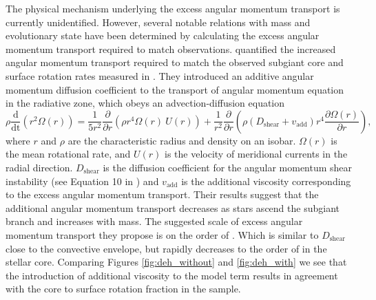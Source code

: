 The physical mechanism underlying the excess angular momentum transport is currently unidentified.
However, several notable relations with mass and evolutionary state have been determined by calculating the excess angular momentum transport required to match observations. 
\citet{spada_angular_2016} quantified the increased angular momentum transport required to match the observed subgiant core and surface rotation rates measured in \citet{deheuvels_seismic_2014}.
They introduced an additive angular momentum diffusion coefficient to the transport of angular momentum equation in the radiative zone, which obeys an advection-diffusion equation 
\begin{equation}
    \rho \frac{\text{d}}{\text{dt}}\left(r^2 \Omega \left( r \right)\right) = \frac{1}{5r^2}\frac{\partial}{\partial r}\left(\rho r^4 \Omega \left( r \right)
 \ U\left(r\right)\right) + \frac{1}{r^2}\frac{\partial}{\partial r} \left(\rho \left( D_{\text{shear}} + v_{\text{add}}\right) r^4 \frac{\partial \Omega\left( r \right)}{\partial r}\right),
\end{equation}
where $r$ and $\rho$ are the characteristic radius and density on an isobar. $\Omega(r)$ is the mean rotational rate, and $U(r)$ is the velocity of meridional currents in the radial direction. $D_{\text{shear}}$ is the diffusion coefficient for the angular momentum shear instability (see Equation 10 in \citet{eggenberger_effects_2010}) and $v_{\text{add}}$ is the additional viscosity corresponding to the excess angular momentum transport.
Their results suggest that the additional angular momentum transport decreases as stars ascend the subgiant branch and increases with mass.
The suggested scale of excess angular momentum transport they propose is on the order of .
Which is similar to $D_{\text{shear}}$ close to the convective envelope, but rapidly decreases to the order of  in the stellar core.
Comparing Figures \ref{fig:deh_without} and \ref{fig:deh_with} we see that the introduction of additional viscosity to the model term results in agreement with the core to surface rotation fraction in the \citet{deheuvels_seismic_2014} sample.

